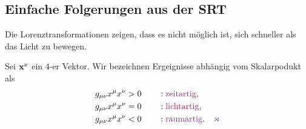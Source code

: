 
\subsection{Einfache Folgerungen aus der SRT}

Die Lorenztransformationen zeigen, dass es nicht möglich ist, sich schneller
als das Licht zu bewegen.

\begin{defnn}
Sei $\bm{\mathrm{x}}^\nu$ ein $4$-er Vektor. Wir bezeichnen Ergeignisse abhängig vom
Skalarpodukt als
\begin{align*}
&g_{\mu\nu}x^\mu x^\nu > 0 \qquad: \text{\emph{zeitartig}},\\
&g_{\mu\nu}x^\mu x^\nu = 0 \qquad: \text{\emph{lichtartig}},\\
&g_{\mu\nu}x^\mu x^\nu < 0 \qquad: \text{\emph{raumartig}}.\fishhere
\end{align*}
\end{defnn}

